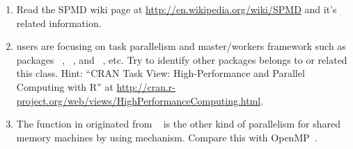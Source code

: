 \begin{enumerate}[label=\thechapter-\arabic*]
\item
Read the SPMD wiki page at
\url{http://en.wikipedia.org/wiki/SPMD}
and it's related information.

\item
{} users are focusing on task parallelism and master/workers
framework such as packages
~\citep{Tierney2012},
~\citep{parallel}, and
~\citep{Rmpi}, etc.
Try to identify other packages belongs to or related this class.
{\color{blue}Hint:
``CRAN Task View: High-Performance and Parallel Computing with R'' at
\url{http://cran.r-project.org/web/views/HighPerformanceComputing.html}.
}

\item
The function 
in  originated
from ~\citep{multicore}
is the other kind of parallelism for shared memory machines by using
 mechanism.
Compare this with OpenMP~\citep{OpenMP}.


\end{enumerate}

